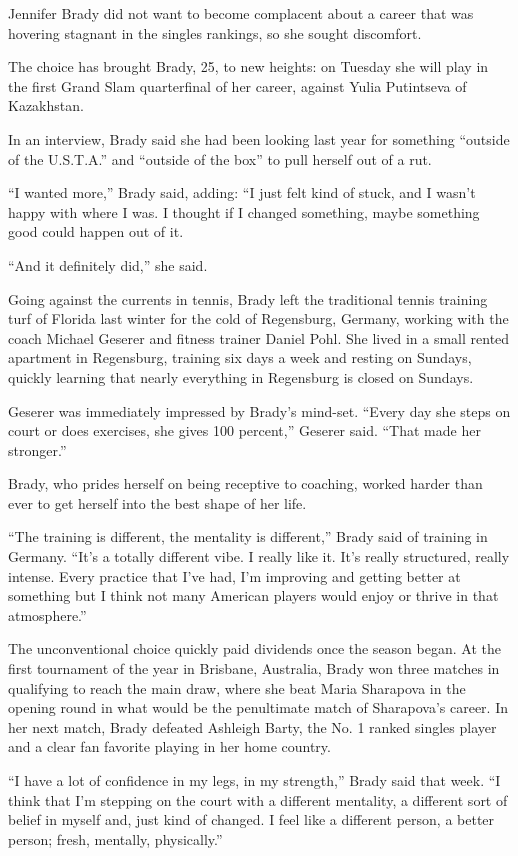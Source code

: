 Jennifer Brady did not want to become complacent about a career that was
hovering stagnant in the singles rankings, so she sought discomfort.

The choice has brought Brady, 25, to new heights: on Tuesday she will
play in the first Grand Slam quarterfinal of her career, against Yulia
Putintseva of Kazakhstan.

In an interview, Brady said she had been looking last year for something
``outside of the U.S.T.A.'' and ``outside of the box'' to pull herself
out of a rut.

``I wanted more,'' Brady said, adding: ``I just felt kind of stuck, and
I wasn't happy with where I was. I thought if I changed something, maybe
something good could happen out of it.

``And it definitely did,'' she said.

Going against the currents in tennis, Brady left the traditional tennis
training turf of Florida last winter for the cold of Regensburg,
Germany, working with the coach Michael Geserer and fitness trainer
Daniel Pohl. She lived in a small rented apartment in Regensburg,
training six days a week and resting on Sundays, quickly learning that
nearly everything in Regensburg is closed on Sundays.

Geserer was immediately impressed by Brady's mind-set. ``Every day she
steps on court or does exercises, she gives 100 percent,'' Geserer said.
``That made her stronger.''

Brady, who prides herself on being receptive to coaching, worked harder
than ever to get herself into the best shape of her life.

``The training is different, the mentality is different,'' Brady said of
training in Germany. ``It's a totally different vibe. I really like it.
It's really structured, really intense. Every practice that I've had,
I'm improving and getting better at something but I think not many
American players would enjoy or thrive in that atmosphere.''

The unconventional choice quickly paid dividends once the season began.
At the first tournament of the year in Brisbane, Australia, Brady won
three matches in qualifying to reach the main draw, where she beat Maria
Sharapova in the opening round in what would be the penultimate match of
Sharapova's career. In her next match, Brady defeated Ashleigh Barty,
the No. 1 ranked singles player and a clear fan favorite playing in her
home country.

``I have a lot of confidence in my legs, in my strength,'' Brady said
that week. ``I think that I'm stepping on the court with a different
mentality, a different sort of belief in myself and, just kind of
changed. I feel like a different person, a better person; fresh,
mentally, physically.''

